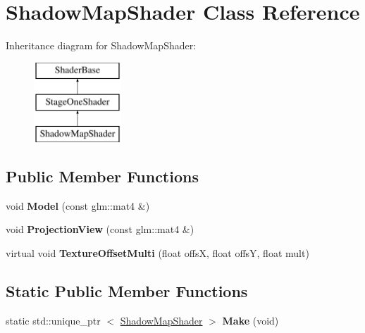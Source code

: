 \hypertarget{classShadowMapShader}{\section{\-Shadow\-Map\-Shader \-Class \-Reference}
\label{classShadowMapShader}
}
\-Inheritance diagram for \-Shadow\-Map\-Shader\-:\begin{figure}[H]
\begin{center}
\leavevmode
\includegraphics[height=3.000000cm]{classShadowMapShader}
\end{center}
\end{figure}
\subsection*{\-Public \-Member \-Functions}
\begin{DoxyCompactItemize}
\item 
\hypertarget{classShadowMapShader_a62b0337ad224285324617e419eb671dc}{void {\bfseries \-Model} (const glm\-::mat4 \&)}\label{classShadowMapShader_a62b0337ad224285324617e419eb671dc}

\item 
\hypertarget{classShadowMapShader_a885d50b5689ed609a8b67cbc7e78b595}{void {\bfseries \-Projection\-View} (const glm\-::mat4 \&)}\label{classShadowMapShader_a885d50b5689ed609a8b67cbc7e78b595}

\item 
\hypertarget{classShadowMapShader_a6bec41d5a6905c9c31fb276beb7ab448}{virtual void {\bfseries \-Texture\-Offset\-Multi} (float offs\-X, float offs\-Y, float mult)}\label{classShadowMapShader_a6bec41d5a6905c9c31fb276beb7ab448}

\end{DoxyCompactItemize}
\subsection*{\-Static \-Public \-Member \-Functions}
\begin{DoxyCompactItemize}
\item 
\hypertarget{classShadowMapShader_a3d11aef31beba66abbe2fc94749c9758}{static std\-::unique\-\_\-ptr\*
$<$ \hyperlink{classShadowMapShader}{\-Shadow\-Map\-Shader} $>$ {\bfseries \-Make} (void)}\label{classShadowMapShader_a3d11aef31beba66abbe2fc94749c9758}

\end{DoxyCompactItemize}
